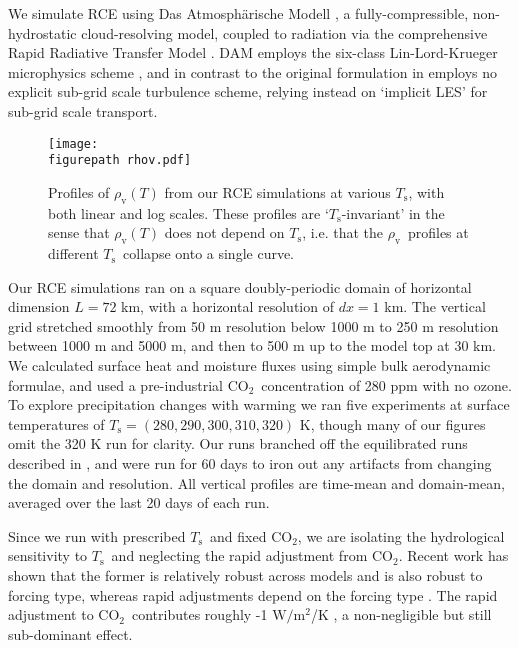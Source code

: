 \documentclass[9pt,twocolumn,twoside,lineno]{pnas-new}
\newcommand{\cotwo}{\ensuremath{\mathrm{CO_2}}}
\newcommand{\Wmsq}{\ensuremath{\mathrm{W/m^2}}}
\newcommand{\rhov}{\ensuremath{\rho_\mathrm{v}}}
\newcommand{\Ts}{\ensuremath{T_\mathrm{s}}}
\newcommand{\figurepath}{./}
\begin{document}
We simulate RCE using Das Atmosph\"arische Modell \cite[DAM,][]{romps2008}, a fully-compressible, non-hydrostatic cloud-resolving model, coupled to radiation via the comprehensive Rapid Radiative Transfer Model 
\cite[RRTM,][]{mlawer1997}. DAM employs the six-class Lin-Lord-Krueger  microphysics scheme \cite{lin1983, lord1984, krueger1995}, and in contrast to the original formulation in \cite{romps2008} employs no explicit sub-grid scale turbulence scheme, relying instead on `implicit LES'  \citep[][essentially just the existing numerical diffusion]{margolin2006}  for sub-grid scale transport.

\begin{figure}[t]
	\begin{center}
			\texttt{[image: \\figurepath rhov.pdf]}
		\caption{Profiles of $\rhov(T)$ from our RCE simulations at various \Ts, with both linear and log scales. These profiles are `\Ts-invariant' in the sense that $\rhov(T)$ does not depend on \Ts, i.e. that the \rhov\ profiles at different \Ts\ collapse onto a single curve.
		\label{rhov_fig}
		}
	\end{center}
\end{figure}

	
	Our RCE simulations ran on a square doubly-periodic domain of horizontal dimension $L=72$ km, with  a horizontal resolution of $dx=1$ km. The vertical grid stretched smoothly from 50 m resolution below 1000 m to 250 m resolution between 1000 m and 5000 m, and then to 500 m up to the model top at  30 km. We calculated surface heat and moisture fluxes using simple bulk aerodynamic formulae, and used a pre-industrial \cotwo\  concentration of 280 ppm with no ozone. To explore precipitation changes  with warming we ran five experiments at surface temperatures of $\Ts=(280,290,300,310,320)$ K, though many of our figures omit the 320 K run for clarity. Our runs branched off the equilibrated runs described in \cite{romps2014}, and were run for 60 days  to iron out any artifacts from changing the domain and resolution. All vertical profiles are time-mean and domain-mean, averaged over the last 20 days of each run. 
	
Since we run with prescribed \Ts\ and fixed \cotwo, we are isolating the hydrological sensitivity to \Ts\ and neglecting the rapid adjustment from \cotwo.  Recent work has shown that the former is relatively robust across models and is also robust to forcing type, whereas rapid adjustments depend on the forcing type \cite{flaschner2016,samset2017}. The rapid adjustment to \cotwo\ contributes roughly -1 \Wmsq/K \cite{pendergrass2014}, a non-negligible but still sub-dominant effect. 
\end{document}
